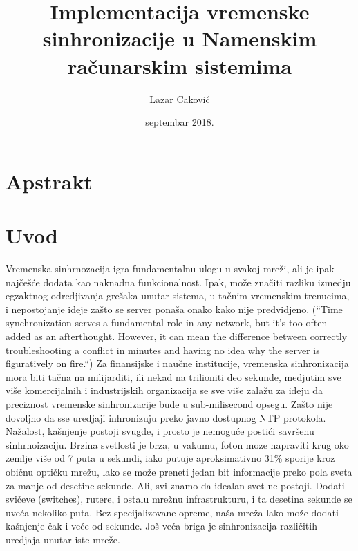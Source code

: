 \documentclass[a4paper,12pt, master]{etf}
\title{Implementacija vremenske sinhronizacije u Namenskim ra\v{c}unarskim sistemima}
\author{Lazar Caković}
\date{septembar 2018.}
\begin{document}
	\maketitle

	\tableofcontents

	\listoffigures

	\newpage

	\chapter{Apstrakt}

	\newpage

	\chapter{Uvod}

	Vremenska sinhrnozacija igra fundamentalnu ulogu u svakoj mre\v{z}i, ali je ipak naj\v{c}e\v{s}\'{c}e 
	dodata kao naknadna funkcionalnost. Ipak, mo\v{z}e zna\v{c}iti razliku izmedju egzaktnog 
	odredjivanja gre\v{s}aka unutar sistema, u ta\v{c}nim vremenskim trenucima, i nepostojanje ideje 
	za\v{s}to se server pona\v{s}a onako kako nije predvidjeno. (``Time synchronization 
	serves a fundamental role in any network, but it's too often added as an afterthought. 
	However, it can mean the difference between correctly troubleshooting a conflict in 
	minutes and having no idea why the server is figuratively on fire.``) Za finansijske i 
	nau\v{c}ne institucije, vremenska sinhronizacija mora biti ta\v{c}na na milijarditi, ili nekad na 
	trilioniti deo sekunde, medjutim sve vi\v{s}e komercijalnih i industrijskih organizacija se 
	sve vi\v{s}e zala\v{z}u za ideju da preciznost vremenske sinhronizacije bude u sub-milisecond 
	opsegu.	Za\v{s}to nije dovoljno da sse uredjaji inhronizuju preko javno dostupnog NTP 
	protokola. Na\v{z}alost, ka\v{s}njenje postoji svugde, i prosto je nemogu\'{c}e posti\'{c}i savr\v{s}enu 
	sinhrnoizaciju. Brzina svetlosti je brza, u vakumu, foton moze napraviti krug oko zemlje 
	vi\v{s}e od 7 puta u sekundi, iako putuje aproksimativno 31\% sporije kroz obi\v{c}nu opti\v{c}ku 
	mre\v{z}u, lako se mo\v{z}e preneti jedan bit informacije preko pola sveta za manje od desetine 
	sekunde. Ali, svi znamo da idealan svet ne postoji. Dodati svi\v{c}eve (switches), 
	rutere, i ostalu mre\v{z}nu infrastrukturu, i ta desetina sekunde se uve\'{c}a nekoliko puta. Bez 
    specijalizovane opreme, na\v{s}a mre\v{z}a lako mo\v{z}e dodati ka\v{s}njenje \v{c}ak i ve\'{c}e od 
	sekunde. Jo\v{s} ve\'{c}a briga je sinhronizacija razli\v{c}itih uredjaja unutar iste mre\v{z}e. 
	
\end{document}
